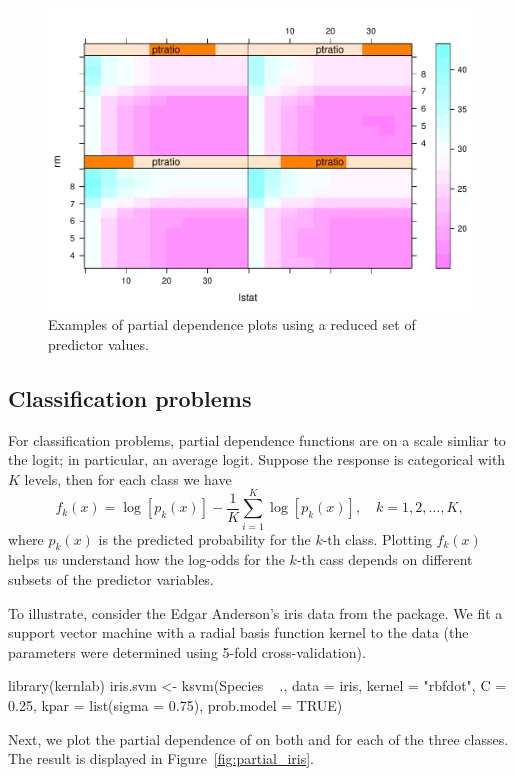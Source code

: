\begin{figure}[htbp]
  \centering
  \includegraphics[width=0.8\linewidth]{partial_3}
  \caption{Examples of partial dependence plots using a reduced set of predictor values.}
  \label{fig:partial_3}
\end{figure}

\subsection{Classification problems}

For classification problems, partial dependence functions are on a scale simliar to the logit; in particular, an average logit. Suppose the response is categorical with $K$ levels, then for each class we have
\begin{equation}
\label{eqn:avg-logit}
f_k(x) = \log\left[p_k(x)\right] - \frac{1}{K}\sum_{i = 1}^K\log\left[p_k(x)\right], \quad k = 1, 2, \dots, K,
\end{equation}
where $p_k(x)$ is the predicted probability for the $k$-th class. Plotting $f_k(x)$ helps us understand how the log-odds for the $k$-th cass depends on different subsets of the predictor variables.

To illustrate, consider the Edgar Anderson's iris data from the  package. We fit a support vector machine with a radial basis function kernel to the data (the parameters were determined using 5-fold cross-validation).
\begin{example}
library(kernlab)
iris.svm <- ksvm(Species ~ ., data = iris, kernel = "rbfdot", C = 0.25,
                 kpar = list(sigma = 0.75), prob.model = TRUE)
\end{example}

Next, we plot the partial dependence of  on both  and  for each of the three classes. The result is displayed in Figure~\ref{fig:partial_iris}.

